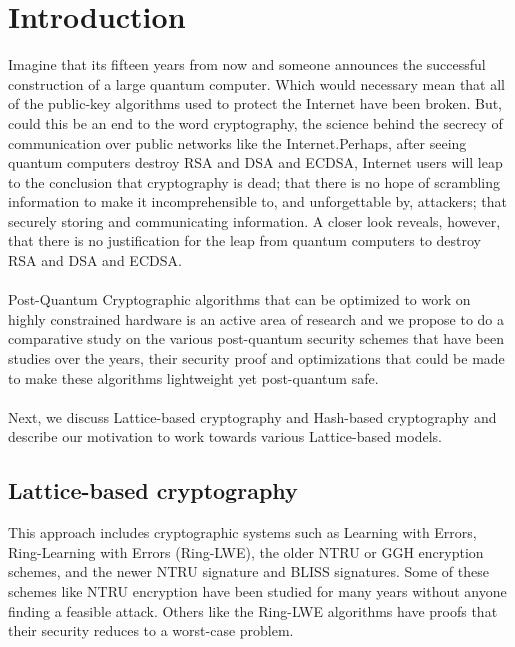 \documentclass[conference]{IEEEtran}
\begin{document}
\section{Introduction}
Imagine that its fifteen years from now and someone announces the successful construction of a large quantum computer. Which would necessary mean that all of the public-key algorithms used to protect the Internet have been broken. But, could this be an end to the word cryptography, the science behind the secrecy of communication over public networks like the Internet.Perhaps, after seeing quantum computers destroy RSA and DSA and ECDSA, Internet users will leap to the conclusion that cryptography is dead; that there is no hope of scrambling information to make it incomprehensible to, and unforgettable by, attackers; that securely storing and communicating information.
A closer look reveals, however, that there is no justification for the leap from quantum computers to destroy RSA and DSA and ECDSA.\\
\\
Post-Quantum Cryptographic algorithms that can be optimized to work on highly constrained hardware is an active area of research and we propose to do a comparative study on the various post-quantum security schemes that have been studies over the years, their security proof and optimizations that could be made to make these algorithms lightweight yet post-quantum safe.\\
\\
Next, we discuss Lattice-based cryptography and Hash-based cryptography and describe our motivation to work towards various Lattice-based models.

\subsection{Lattice-based cryptography}
This approach includes cryptographic systems such as Learning with Errors, Ring-Learning with Errors (Ring-LWE), the older NTRU or GGH encryption schemes, and the newer NTRU signature and BLISS signatures. Some of these schemes like NTRU encryption have been studied for many years without anyone finding a feasible attack. Others like the Ring-LWE algorithms have proofs that their security reduces to a worst-case problem.
\end{document}
